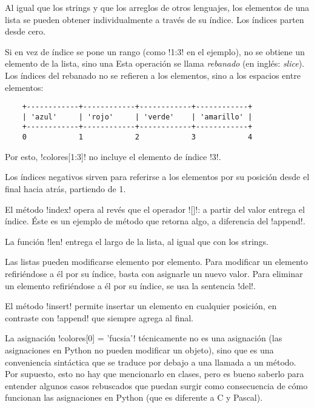 \documentclass[10pt]{article}
\begin{document}
  Al igual que los strings y que los arreglos de otros lenguajes,
  los elementos de una lista se pueden obtener individualmente
  a través de su índice.
  Los índices parten desde cero.

  Si en vez de índice se pone un rango (como \li!1:3! en el ejemplo),
  no se obtiene un elemento de la lista, sino una 
  Esta operación se llama \emph{rebanado} (en inglés: \emph{slice}).
  Los índices del rebanado no se refieren a los elementos,
  sino a los espacios entre elementos:
  \begin{verbatim}
    +------------+------------+------------+------------+
    | 'azul'     | 'rojo'     | 'verde'    | 'amarillo' |
    +------------+------------+------------+------------+
    0            1            2            3            4\end{verbatim}
  Por esto, \li!colores[1:3]! no incluye el elemento de índice \li!3!.

  Los índices negativos sirven para referirse a los elementos
  por su posición desde el final hacia atrás, partiendo de 1.

  El método \li!index! opera al revés que el operador \li![]!:
  a partir del valor entrega el índice.
  Éste es un ejemplo de método que retorna algo, a diferencia del \li!append!.

  La función \li!len! entrega el largo de la lista,
  al igual que con los strings.


  Las listas pueden modificarse elemento por elemento.
  Para modificar un elemento refiriéndose a él por su índice,
  basta con asignarle un nuevo valor.
  Para eliminar un elemento refiriéndose a él por su índice,
  se usa la sentencia \li!del!.

  El método \li!insert! permite insertar un elemento
  en cualquier posición,
  en contraste con \li!append! que siempre agrega al final.

  La asignación \li!colores[0] = 'fucsia'!
  técnicamente no es una asignación
  (las asignaciones en Python no pueden modificar un objeto),
  sino que es una conveniencia sintáctica
  que se traduce por debajo a una llamada a un método.
  Por supuesto, esto no hay que mencionarlo en clases,
  pero es bueno saberlo para entender algunos casos rebuscados que puedan surgir
  como consecuencia de cómo funcionan las asignaciones en Python
  (que es diferente a C y Pascal).

\end{document}
